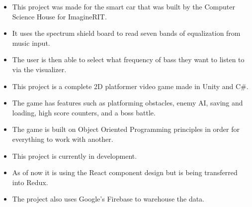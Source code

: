 \documentclass[10pt,a4paper,ragged2e]{altacv}
\begin{document}
\begin{itemize}
\item This project was made for the smart car that was built by the Computer Science House for ImagineRIT.
\item It uses the spectrum shield board to read seven bands of equalization from music input.
\item The user is then able to select what frequency of bass they want to listen to via the visualizer.
\end{itemize}
\divider

\begin{itemize}
\item This project is a complete 2D platformer video game made in Unity and C#.
\item The game has features such as platforming obstacles, enemy AI, saving and loading, high score counters, and a boss battle.
\item The game is built on Object Oriented Programming principles in order for everything to work with another.
\end{itemize}
\divider

\begin{itemize}
    \item This project is currently in development.
    \item As of now it is using the React component design but is being transferred into Redux.
    \item The project also uses Google's Firebase to warehouse the data.
\end{itemize}
\divider



\end{document}
